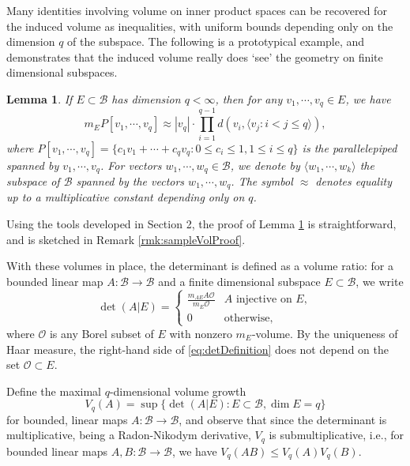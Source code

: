 \documentclass[11pt]{amsart}
\theoremstyle{theorem}
\newtheorem{lem}[thm]{Lemma}
\theoremstyle{definition}
\numberwithin{equation}{section}
\newcommand{\Bc}{\mathcal{B}}
\newcommand{\Oc}{\mathcal{O}}
\begin{document}
Many identities involving volume on inner product spaces can be recovered for the induced volume as inequalities, with uniform bounds depending only on the dimension $q$ of the subspace. The following is a prototypical example, and demonstrates that the induced volume really does `see' the geometry on finite dimensional subspaces.

\begin{lem}\label{lem:sampleVol}
If $E \subset \Bc$ has dimension $q < \infty$, then for any $v_1, \cdots, v_q \in E$, we have
\[
 m_E P[v_1, \cdots, v_q] \approx |v_q| \cdot \prod_{i = 1}^{q-1} d(v_i, \langle v_j : i < j \leq q \rangle), 
\]
where $P[v_1, \cdots, v_q] = \{c_1 v_1 + \cdots + c_q v_q : 0 \leq c_i \leq 1, 1 \leq i \leq q\}$ is the parallelepiped spanned by $v_1, \cdots, v_q$. For vectors $w_1, \cdots, w_q \in \Bc$, we denote by $\langle w_1, \cdots, w_k \rangle$ the subspace of $\Bc$ spanned by the vectors $w_1, \cdots, w_q$.  The symbol $\approx$ denotes equality up to a multiplicative constant depending only on $q$.
\end{lem}
\noindent Using the tools developed in Section 2, the proof of Lemma \ref{lem:sampleVol} is straightforward, and is sketched in Remark \ref{rmk:sampleVolProof}.

With these volumes in place, the determinant is defined as a volume ratio: for a bounded linear map $A : \Bc \to \Bc$ and a finite dimensional subspace $ E \subset \Bc$, we write
\begin{equation} \label{eq:detDefinition}
\det(A | E) =  \begin{cases}
 \frac{m_{AE} A \Oc}{m_E \Oc} & A \text{ injective on } E, \\
 0 & \text{otherwise,}
 \end{cases}
\end{equation}
where $\Oc$ is any Borel subset of $E$ with nonzero $m_E$-volume. By the uniqueness of Haar measure, the right-hand side of \eqref{eq:detDefinition} does not depend on the set $\Oc \subset E$.

Define the maximal $q$-dimensional volume growth
\begin{equation}\label{eq:maxVolGrow}
V_q(A) = \sup\{\det(A  |E) : E \subset \Bc, \dim E = q\}
\end{equation}
for bounded, linear maps $A : \Bc \to \Bc$, and observe that since the determinant is multiplicative, being a Radon-Nikodym derivative, $V_q$ is submultiplicative, i.e., for bounded linear maps $A, B : \Bc \to \Bc$, we have $V_q(AB) \leq V_q(A) V_q(B)$.
\end{document}
